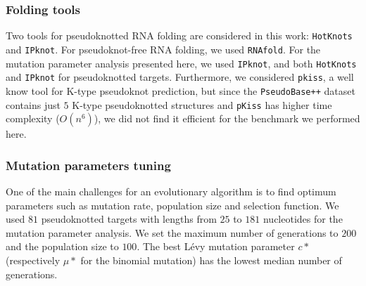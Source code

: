 \subsubsection{Folding tools}
Two tools for pseudoknotted RNA folding are considered in this work: \texttt{HotKnots} and \texttt{IPknot}. For pseudoknot-free RNA folding, we used \texttt{RNAfold}.
For the mutation parameter analysis presented here, we used \texttt{IPknot}, and both \texttt{HotKnots} and \texttt{IPknot} for pseudoknotted targets. Furthermore, we considered \texttt{pkiss}, a well know tool for K-type pseudoknot prediction, but since the \texttt{PseudoBase++} dataset contains just $5$ K-type pseudoknotted structures and \texttt{pKiss} has higher time complexity ($O(n^6)$), we did not find it efficient for the benchmark we performed here. 
\subsubsection{Mutation parameters tuning}
One of the main challenges for an evolutionary algorithm is to find optimum parameters such as mutation rate, population size and selection function.
We used $81$ pseudoknotted targets with lengths from $25$ to $181$ nucleotides for the mutation parameter analysis. We set the maximum number of generations to $200$ and the population size to $100$. The best Lévy mutation parameter $c*$ (respectively $\mu*$ for the binomial mutation) has the lowest median number of generations. 


